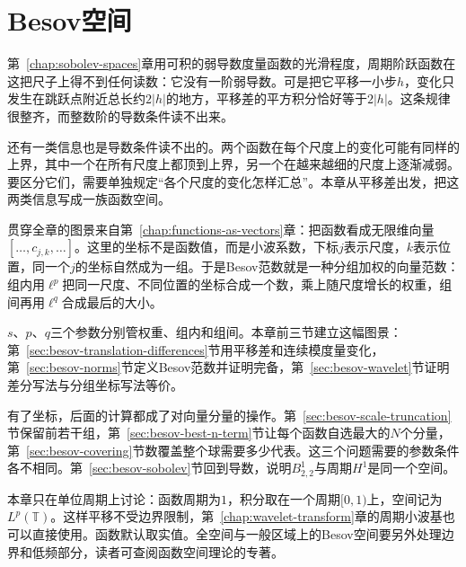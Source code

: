 \chapter{Besov空间}
\label{chap:besov-spaces}

第~\ref{chap:sobolev-spaces}章用可积的弱导数度量函数的光滑程度，周期阶跃函数在这把尺子上得不到任何读数：它没有一阶弱导数。可是把它平移一小步$h$，变化只发生在跳跃点附近总长约$2\lvert h\rvert$的地方，平移差的平方积分恰好等于$2\lvert h\rvert$。这条规律很整齐，而整数阶的导数条件读不出来。

还有一类信息也是导数条件读不出的。两个函数在每个尺度上的变化可能有同样的上界，其中一个在所有尺度上都顶到上界，另一个在越来越细的尺度上逐渐减弱。要区分它们，需要单独规定“各个尺度的变化怎样汇总”。本章从平移差出发，把这两类信息写成一族函数空间。

贯穿全章的图景来自第~\ref{chap:functions-as-vectors}章：把函数看成无限维向量$[\ldots,c_{j,k},\ldots]$。这里的坐标不是函数值，而是小波系数，下标$j$表示尺度，$k$表示位置，同一个$j$的坐标自然成为一组。于是Besov范数就是一种分组加权的向量范数：组内用$\ell^p$把同一尺度、不同位置的坐标合成一个数，乘上随尺度增长的权重，组间再用$\ell^q$合成最后的大小。

$s$、$p$、$q$三个参数分别管权重、组内和组间。本章前三节建立这幅图景：第~\ref{sec:besov-translation-differences}节用平移差和连续模度量变化，第~\ref{sec:besov-norms}节定义Besov范数并证明完备，第~\ref{sec:besov-wavelet}节证明差分写法与分组坐标写法等价。

有了坐标，后面的计算都成了对向量分量的操作。第~\ref{sec:besov-scale-truncation}节保留前若干组，第~\ref{sec:besov-best-n-term}节让每个函数自选最大的$N$个分量，第~\ref{sec:besov-covering}节数覆盖整个球需要多少代表。这三个问题需要的参数条件各不相同。第~\ref{sec:besov-sobolev}节回到导数，说明$B^1_{2,2}$与周期$H^1$是同一个空间。

本章只在单位周期上讨论：函数周期为$1$，积分取在一个周期$[0,1)$上，空间记为$L^p(\mathbb T)$。这样平移不受边界限制，第~\ref{chap:wavelet-transform}章的周期小波基也可以直接使用。函数默认取实值。全空间与一般区域上的Besov空间要另外处理边界和低频部分，读者可查阅函数空间理论的专著。










